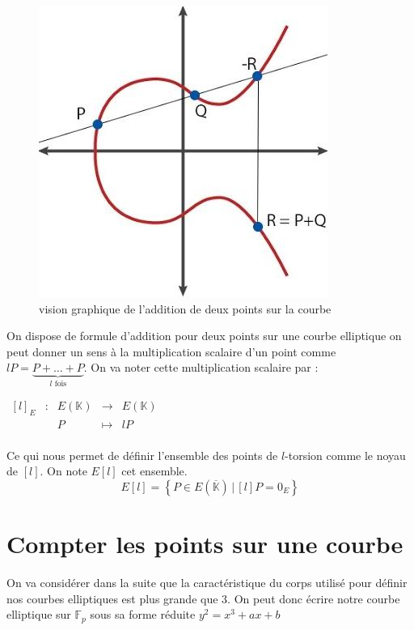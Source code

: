 \documentclass[12pt]{article}
\begin{document}
\begin{figure}[h!]
\includegraphics[scale=0.7]{pictures/hqdefault.jpg} 
\caption{vision graphique de l'addition de deux points sur la courbe}
\end{figure}


On dispose de formule d'addition pour deux points sur une courbe elliptique on peut donner un sens à la multiplication scalaire d'un point comme $lP = \underbrace{P + \ldots + P}_{l \text{ fois}}$. On va noter cette multiplication scalaire par :
\newline

$\begin{array}{ccccc}
[l]_E & : & E(\mathbb{K}) & \to & E(\mathbb{K}) \\
 & & P & \mapsto & lP\\
\end{array}$

Ce qui nous permet de définir l'ensemble des points de $l$-torsion comme le noyau de $[l]$. On note $E[l]$ cet ensemble.
\newline
$$E[l] = \left\{ P \in E(\overline{\mathbb{K}}) \, | \, [l]P = 0_E \right\} $$

\section{Compter les points sur une courbe}
On va considérer dans la suite que la caractéristique du corps utilisé pour définir nos courbes elliptiques est plus grande que $3$. On peut donc écrire notre courbe elliptique sur $\mathbb{F}_p$ sous sa forme réduite $y^2 = x^3 + ax+b$
\end{document}
